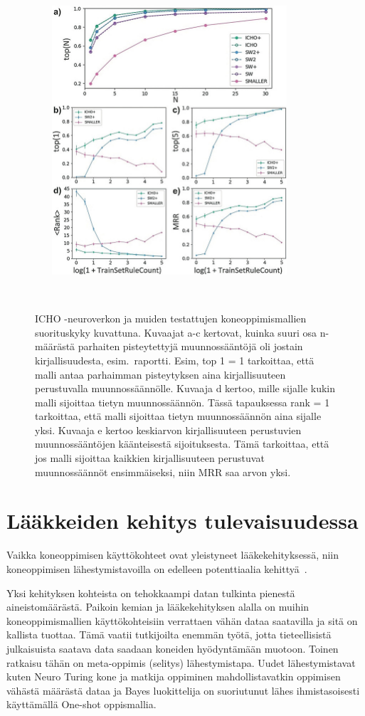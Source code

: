 \documentclass[finnish,twoside,censored,tkt,sw-line]{HYthesisML}
\begin{document}
\begin{figure}[ht]
    \centering
    \includegraphics[width=10cm, height=10cm]{icho-performance-fig.jpg}
    \caption{
        ICHO -neuroverkon ja muiden testattujen koneoppimismallien suorituskyky kuvattuna.
        Kuvaajat a-c kertovat, kuinka suuri osa n-määrästä parhaiten pisteytettyjä muunnossääntöjä oli jostain kirjallisuudesta, esim.\ raportti.
        Esim, top 1 = 1 tarkoittaa, että malli antaa parhaimman pisteytyksen aina kirjallisuuteen perustuvalla muunnossäännölle.
        Kuvaaja d kertoo, mille sijalle kukin malli sijoittaa tietyn muunnossäännön.
        Tässä tapauksessa rank = 1 tarkoittaa, että malli sijoittaa tietyn muunnossäännön aina sijalle yksi.
        Kuvaaja e kertoo keskiarvon kirjallisuuteen perustuvien muunnossääntöjen käänteisestä sijoituksesta.
        Tämä tarkoittaa, että jos malli sijoittaa kaikkien kirjallisuuteen perustuvat muunnossäännöt ensimmäiseksi, niin MRR saa arvon yksi.
    }
    {~\cite{ExpertKnowledgeRetorsynthesis}}
\end{figure}

\chapter{Lääkkeiden kehitys tulevaisuudessa}

Vaikka koneoppimisen käyttökohteet ovat yleistyneet lääkekehityksessä, niin koneoppimisen lähestymistavoilla on edelleen potenttiaalia kehittyä~\cite{ButlerKeithT2018Mlfm}.

Yksi kehityksen kohteista on tehokkaampi datan tulkinta pienestä aineistomäärästä.
Paikoin kemian ja lääkekehityksen alalla on muihin koneoppimismallien käyttökohteisiin verrattaen vähän dataa saatavilla ja sitä on kallista tuottaa.
Tämä vaatii tutkijoilta enemmän työtä, jotta tieteellisistä julkaisuista saatava data saadaan koneiden hyödyntämään muotoon.
Toinen ratkaisu tähän on meta-oppimis (selitys) lähestymistapa.
Uudet lähestymistavat kuten Neuro Turing kone ja matkija oppiminen mahdollistavatkin oppimisen vähästä määrästä dataa ja Bayes luokittelija on suoriutunut lähes ihmistasoisesti käyttämällä One-shot oppismallia.
\end{document}
